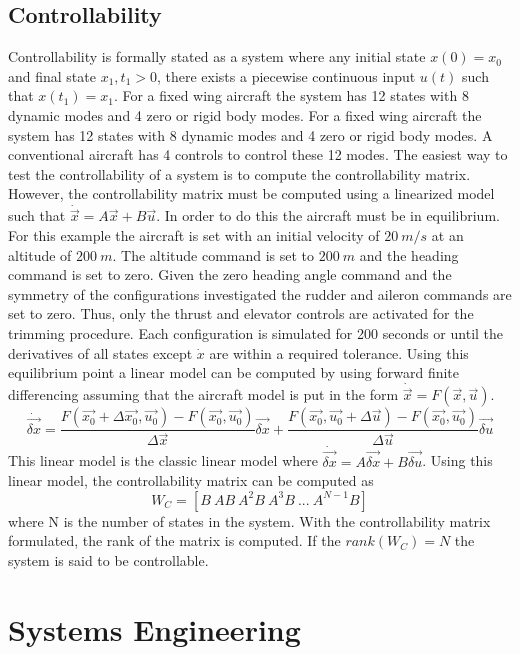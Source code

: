 \documentclass{article}
\begin{document}
\subsection{Controllability}

Controllability is formally stated as a system where any initial
state $x(0)=x_0$ and final state $x_1,t_1>0$, there exists a piecewise
continuous input $u(t)$ such that $x(t_1)=x_1$. 
For a fixed wing aircraft the system has 12 states with 8 dynamic
modes and 4 zero or rigid body modes. For a fixed wing aircraft the system has 12 states with 8 dynamic
modes and 4 zero or rigid body modes. A conventional aircraft has 4
controls to control these 12 modes. The easiest way to test the 
controllability of a system  is to compute the
controllability matrix. However, the controllability matrix must be
computed using a linearized model such that
$\dot{\vec{x}}=A\vec{x}+B\vec{u}$. In order to do this the aircraft
must be in equilibrium. For this example the aircraft is
set with an initial velocity of $20~m/s$ at an altitude of
$200~m$. The altitude command is set to $200~m$ and the heading
command is set to zero. Given the zero heading angle command and the
symmetry of the configurations investigated the rudder and aileron
commands are set to zero. Thus, only the thrust and elevator controls
are activated for the trimming procedure. Each configuration is
simulated for 200 seconds or until the derivatives of all states
except $\dot{x}$ are within a required tolerance. Using this
equilibrium point a linear model can be computed by using forward
finite differencing assuming that the
aircraft model is put in the form $\dot{\vec{x}} = F(\vec{x},\vec{u})$.
\begin{equation}
\dot{\vec{\delta x}} = \frac{F(\vec{x_0}+\Delta \vec{x_0},\vec{u_0})-F(\vec{x_0},\vec{u_0})}{\Delta
  \vec{x}}\vec{\delta x} + \frac{F(\vec{x_0},\vec{u_0}+\Delta
  \vec{u})-F(\vec{x_0},\vec{u_0})}{\Delta \vec{u}}\vec{\delta u}
\end{equation}
This linear model is the classic linear model where
$\dot{\vec{\delta x}}=A\vec{\delta{x}}+B\vec{\delta{u}}$. Using this linear model, the
controllability matrix can be computed as
\begin{equation}
W_C = [B~AB~A^2B~A^3B~...~A^{N-1}B]
\end{equation}
where N is the number of states in the system. With the controllability
matrix formulated, the rank of the matrix is computed. If the
$rank(W_C)=N$ the system is said to be controllable.

\section{Systems Engineering}
\end{document}
